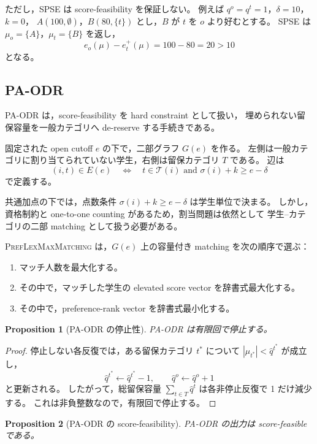 \documentclass[
  12pt,
  a4paper,
  oneside,
  onecolumn,
  titlepage,
  final
]{jsarticle}
\newtheorem{proposition}{Proposition}
\newcommand{\1}{\mathbf{1}}
\begin{document}
ただし，SPSE は score-feasibility を保証しない。
例えば $q^o=q^t=1$，$\delta=10$，$k=0$，
$A(100,\emptyset)$，$B(80,\{t\})$ とし，$B$ が $t$ を $o$ より好むとする。
SPSE は $\mu_o=\{A\}$，$\mu_t=\{B\}$ を返し，
\[
    e_o(\mu)-e_t^+(\mu)=100-80=20>10
\]
となる。

\subsection{PA-ODR}

PA-ODR は，score-feasibility を hard constraint として扱い，
埋められない留保容量を一般カテゴリへ de-reserve する手続きである。

固定された open cutoff $e$ の下で，二部グラフ $G(e)$ を作る。
左側は一般カテゴリに割り当てられていない学生，右側は留保カテゴリ $T$ である。
辺は
\[
    (i,t)\in E(e)
    \quad\Longleftrightarrow\quad
    t\in\mathcal T(i)
    \text{ and }
    \sigma(i)+k\ge e-\delta
\]
で定義する。

共通加点の下では，点数条件 $\sigma(i)+k\ge e-\delta$ は学生単位で決まる。
しかし，資格制約と one-to-one counting があるため，割当問題は依然として
学生--カテゴリの二部 matching として扱う必要がある。

\textsc{PrefLexMaxMatching} は，$G(e)$ 上の容量付き matching を次の順序で選ぶ：
\begin{enumerate}
    \item マッチ人数を最大化する。
    \item その中で，マッチした学生の elevated score vector を辞書式最大化する。
    \item その中で，preference-rank vector を辞書式最小化する。
\end{enumerate}

\begin{proposition}[PA-ODR の停止性]
PA-ODR は有限回で停止する。
\end{proposition}

\begin{proof}
停止しない各反復では，ある留保カテゴリ $t^\ast$ について
$|\mu_{t^\ast}|<\hat q^{t^\ast}$ が成立し，
\[
    \hat q^{t^\ast}\leftarrow \hat q^{t^\ast}-1,
    \qquad
    \hat q^o\leftarrow \hat q^o+1
\]
と更新される。
したがって，総留保容量 $\sum_{t\in T}\hat q^t$ は各非停止反復で 1 だけ減少する。
これは非負整数なので，有限回で停止する。
\end{proof}

\begin{proposition}[PA-ODR の score-feasibility]
PA-ODR の出力は score-feasible である。
\end{proposition}
\end{document}
